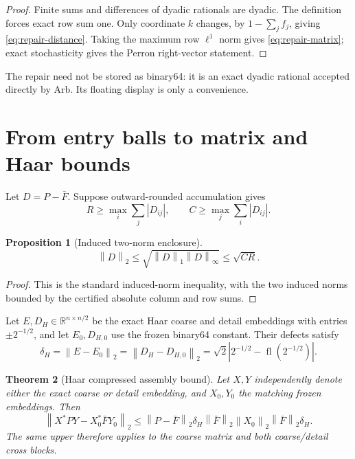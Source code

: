 \documentclass[11pt]{article}
\newtheorem{theorem}{Theorem}[section]
\newtheorem{proposition}[theorem]{Proposition}
\theoremstyle{definition}
\newcommand{\norm}[1]{\left\lVert#1\right\rVert}
\begin{document}
\begin{proof}
Finite sums and differences of dyadic rationals are dyadic.  The definition
forces exact row sum one.  Only coordinate $k$ changes, by
$1-\sum_jf_j$, giving \eqref{eq:repair-distance}.  Taking the maximum row
$\ell^1$ norm gives \eqref{eq:repair-matrix}; exact stochasticity gives the
Perron right-vector statement.
\end{proof}

The repair need not be stored as binary64: it is an exact dyadic rational
accepted directly by Arb.  Its floating display is only a convenience.

\section{From entry balls to matrix and Haar bounds}
\label{sec:norms}

Let $D=P-\bar F$.  Suppose outward-rounded accumulation gives
\[
 R\ge\max_i\sum_j|D_{ij}|,
 \qquad
 C\ge\max_j\sum_i|D_{ij}|.
\]

\begin{proposition}[Induced two-norm enclosure]
\label{prop:two}
\begin{equation}
 \norm D_2\le\sqrt{\norm D_1\norm D_\infty}\le\sqrt{CR}.
 \label{eq:two}
\end{equation}
\end{proposition}

\begin{proof}
This is the standard induced-norm inequality, with the two induced norms
bounded by the certified absolute column and row sums.
\end{proof}

Let $E,D_H\in\mathbb R^{n\times n/2}$ be the exact Haar coarse and detail
embeddings with entries $\pm2^{-1/2}$, and let $E_0,D_{H,0}$ use the frozen
binary64 constant.  Their defects satisfy
\[
 \delta_H=\norm{E-E_0}_2=\norm{D_H-D_{H,0}}_2
 =\sqrt2\left|2^{-1/2}-\operatorname{fl}(2^{-1/2})\right|.
\]

\begin{theorem}[Haar compressed assembly bound]
\label{thm:haar}
Let $X,Y$ independently denote either the exact coarse or detail embedding,
and $X_0,Y_0$ the matching frozen embeddings.  Then
\begin{equation}
 \norm{X^*PY-X_0^*\bar F Y_0}_2
 \le
 \norm{P-\bar F}_2
 \delta_H\norm{\bar F}_2
 \norm{X_0}_2\norm{\bar F}_2\delta_H.
 \label{eq:haar}
\end{equation}
The same upper therefore applies to the coarse matrix and both coarse/detail
cross blocks.
\end{theorem}
\end{document}
